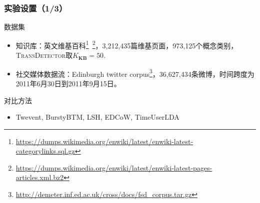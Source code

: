 \begin{frame}
\frametitle{实验设置（1/3）}
\noindent 数据集
\begin{itemize}
	\item 知识库：英文维基百科\footnote{\tiny{\url{https://dumps.wikimedia.org/enwiki/latest/enwiki-latest-categorylinks.sql.gz}}}\ \footnote{\tiny{\url{https://dumps.wikimedia.org/enwiki/latest/enwiki-latest-pages-articles.xml.bz2}}}，3,212,435篇维基页面，973,125个概念类别，\textsc{TransDetector}取$K_{\bm{KB}}=50$.
	\item 社交媒体数据流：Edinburgh twitter corpus\footnote{\tiny{\url{http://demeter.inf.ed.ac.uk/cross/docs/fsd_corpus.tar.gz}}}，36,627,434条微博，时间跨度为2011年6月30日到2011年9月15日。
\end{itemize} 
对比方法
\begin{itemize}
	\item Twevent, BurstyBTM, LSH, EDCoW, TimeUserLDA
\end{itemize}
\end{frame}

